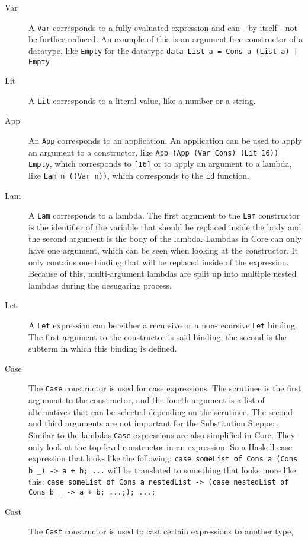 \begin{description}
    \item[Var] A \texttt{Var} corresponds to a fully evaluated expression and can - by itself - not be further reduced.
        An example of this is an argument-free constructor of a datatype, like \texttt{Empty} for the datatype \texttt{data List a = Cons a (List a) | Empty}
    \item[Lit] A \texttt{Lit} corresponds to a literal value, like a number or a string.
    \item[App] An \texttt{App} corresponds to an application.
        An application can be used to apply an argument to a constructor, like \texttt{App (App (Var Cons) (Lit 16)) Empty}, which corresponds to \texttt{[16]}
        or to apply an argument to a lambda, like \texttt{Lam n ((Var n))}, which corresponds to the \texttt{id} function.
    \item[Lam] A \texttt{Lam} corresponds to a lambda.
        The first argument to the \texttt{Lam} constructor is the identifier of the variable that should be replaced inside the body
        and the second argument is the body of the lambda.
        Lambdas in Core can only have one argument, which can be seen when looking at the constructor.
        It only contains one binding that will be replaced inside of the expression.
        Because of this, multi-argument lambdas are split up into multiple nested lambdas during the desugaring process.
    \item[Let] A \texttt{Let} expression can be either a recursive or a non-recursive \texttt{Let} binding.
        The first argument to the constructor is said binding, the second is the subterm in which this binding is defined.
    \item[Case] The \texttt{Case} constructor is used for case expressions.
        The scrutinee is the first argument to the constructor,
        and the fourth argument is a list of alternatives that can be selected depending on the scrutinee.
        The second and third arguments are not important for the Substitution Stepper.
        Similar to the lambdas,\texttt{Case} expressions are also simplified in Core.
        They only look at the top-level constructor in an expression.
        So a Haskell case expression that looks like the following: \texttt{case someList of Cons a (Cons b \_) -> a + b; ...}
        will be translated to something that looks more like this: \texttt{case someList of Cons a nestedList -> (case nestedList of Cons b \_ -> a + b; ...;); ...;}
    \item[Cast] The \texttt{Cast} constructor is used to cast certain expressions to another type,

\end{description}
